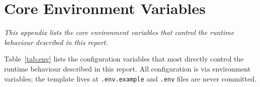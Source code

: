 \chapter{Core Environment Variables}
\label{app:environment}

\begin{center}
\textit{This appendix lists the core environment variables that control the
runtime behaviour described in this report.}
\end{center}

\vspace*{\fill}
\clearpage
\noindent Table~\ref{tab:env} lists the configuration variables that most
directly control the runtime behaviour described in this report. All
configuration is via environment variables; the template lives at
\texttt{.env.example} and \texttt{.env} files are never committed.

